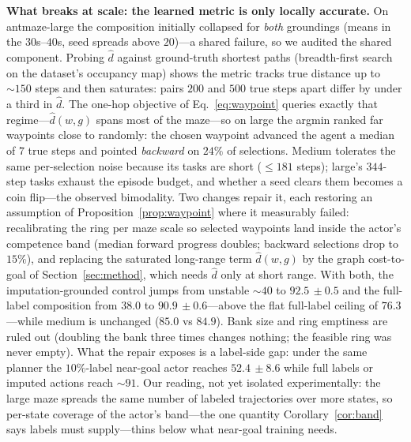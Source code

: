 \documentclass{article}
\newcommand{\pmm}[2]{#1{\scriptstyle\,\pm #2}}
\theoremstyle{plain}
\theoremstyle{definition}
\begin{document}
\textbf{What breaks at scale: the learned metric is only locally accurate.} On antmaze-large the composition initially collapsed for \emph{both} groundings (means in the $30$s--$40$s, seed spreads above $20$)---a shared failure, so we audited the shared component. Probing $\hat d$ against ground-truth shortest paths (breadth-first search on the dataset's occupancy map) shows the metric tracks true distance up to ${\sim}150$ steps and then saturates: pairs $200$ and $500$ true steps apart differ by under a third in $\hat d$. The one-hop objective of Eq.~\ref{eq:waypoint} queries exactly that regime---$\hat d(w,g)$ spans most of the maze---so on large the argmin ranked far waypoints close to randomly: the chosen waypoint advanced the agent a median of $7$ true steps and pointed \emph{backward} on $24\%$ of selections. Medium tolerates the same per-selection noise because its tasks are short ($\le 181$ steps); large's $344$-step tasks exhaust the episode budget, and whether a seed clears them becomes a coin flip---the observed bimodality. Two changes repair it, each restoring an assumption of Proposition~\ref{prop:waypoint} where it measurably failed: recalibrating the ring per maze scale so selected waypoints land inside the actor's competence band (median forward progress doubles; backward selections drop to $15\%$), and replacing the saturated long-range term $\hat d(w,g)$ by the graph cost-to-goal of Section~\ref{sec:method}, which needs $\hat d$ only at short range. With both, the imputation-grounded control jumps from unstable ${\sim}40$ to $\pmm{92.5}{0.5}$ and the full-label composition from $38.0$ to $\pmm{90.9}{0.6}$---above the flat full-label ceiling of $76.3$---while medium is unchanged ($85.0$ vs $84.9$). Bank size and ring emptiness are ruled out (doubling the bank three times changes nothing; the feasible ring was never empty). What the repair exposes is a label-side gap: under the same planner the $10\%$-label near-goal actor reaches $\pmm{52.4}{8.6}$ while full labels or imputed actions reach ${\sim}91$. Our reading, not yet isolated experimentally: the large maze spreads the same number of labeled trajectories over more states, so per-state coverage of the actor's band---the one quantity Corollary~\ref{cor:band} says labels must supply---thins below what near-goal training needs.
\end{document}
